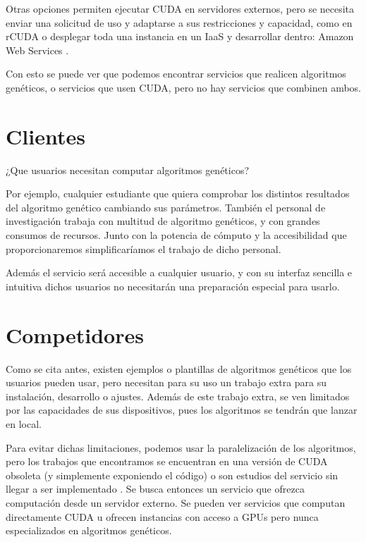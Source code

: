 \bigskip
Otras opciones permiten ejecutar CUDA en servidores externos, pero se necesita enviar una solicitud de uso y adaptarse a sus restricciones y capacidad, como en rCUDA \cite{rcuda}
o desplegar toda una instancia en un IaaS y desarrollar dentro: Amazon Web Services \cite{amazoncuda}.

\bigskip
Con esto se puede ver que podemos encontrar servicios que realicen algoritmos genéticos, o servicios que usen CUDA, pero no hay servicios que combinen ambos.


\bigskip
\section{Clientes}
\bigskip

¿Que usuarios necesitan computar algoritmos genéticos?

Por ejemplo, cualquier estudiante que quiera comprobar los distintos resultados del algoritmo genético cambiando sus parámetros. También el personal de investigación trabaja con multitud de algoritmo genéticos, y con grandes consumos de recursos. Junto con la potencia de cómputo y la accesibilidad que proporcionaremos simplificaríamos el trabajo de dicho personal. 

Además el servicio será accesible a cualquier usuario, y con su interfaz sencilla e intuitiva dichos usuarios no necesitarán una preparación especial para usarlo. 

\bigskip
\section{Competidores}
\bigskip

Como se cita antes, existen ejemplos o plantillas de algoritmos genéticos \cite{agpython} \cite{agjava} \cite{agmatlab} que los usuarios pueden usar, pero necesitan para su uso un trabajo extra para su instalación, desarrollo o ajustes. Además de este trabajo extra, se ven limitados por las capacidades de sus dispositivos, pues los algoritmos se tendrán que lanzar en local.

Para evitar dichas limitaciones, podemos usar la paralelización de los algoritmos, pero los trabajos que encontramos se encuentran en una versión de CUDA obsoleta \cite{paralelizacioncuda} (y simplemente exponiendo el código) o son estudios del servicio sin llegar a ser implementado \cite{optimizacionparalelizacioncuda}. Se busca entonces un servicio que ofrezca computación desde un servidor externo. Se pueden ver servicios que computan directamente CUDA \cite{rcuda} u ofrecen instancias con acceso a GPUs \cite{amazoncuda}  pero nunca especializados en algoritmos genéticos.


